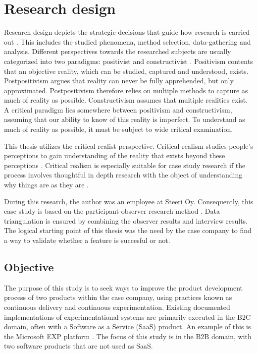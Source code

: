 \documentclass[english]{tktltiki2}
\theoremstyle{definition}
\theoremstyle{remark}
\begin{document}
\section{Research design}
Research design depicts the strategic decisions that guide how research is carried out \cite{denzin2000discipline}. This includes the studied phenomena, method selection, data-gathering and analysis. Different perspectives towards the researched subjects are usually categorized into two paradigms: positivist and constructivist \cite{gephart2004qualitative}. Positivism contents that an objective reality, which can be studied, captured and understood, exists. Postpositivism argues that reality can never be fully apprehended, but only approximated. Postpositivism therefore relies on multiple methods to capture as much of reality as possible. Constructivism assumes that multiple realities exist. A critical paradigm lies somewhere between positivism and constructivism, assuming that our ability to know of this reality is imperfect. To understand as much of reality as possible, it must be subject to wide critical examination. 

This thesis utilizes the critical realist perspective. Critical realism studies people's perceptions to gain understanding of the reality that exists beyond these perceptions \cite{healy2000comprehensive}. Critical realism is especially suitable for case study research if the process involves thoughtful in depth research with the object of understanding why things are as they are \cite{easton2010critical}. 

During this research, the author was an employee at Steeri Oy. Consequently, this case study is based on the participant-observer research method \cite{strauss1990basics}. Data triangulation is ensured by combining the observer results and interview results. The logical starting point of this thesis was the need by the case company to find a way to validate whether a feature is succesful or not. 

\subsection{Objective} %
The purpose of this study is to seek ways to improve the product development process of two products within the case company, using practices known as continuous delivery and continuous experimentation. Existing documented implementations of experimentational systems are primarily executed in the B2C domain, often with a Software as a Service (SaaS) product. An example of this is the Microsoft EXP platform \cite{ep}. The focus of this study is in the B2B domain, with two software products that are not used as SaaS. 
\end{document}
